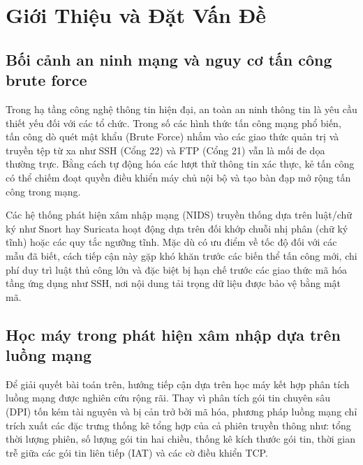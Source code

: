 
\chapter{Giới Thiệu và Đặt Vấn Đề}
\label{chap:gioi_thieu}

\section{Bối cảnh an ninh mạng và nguy cơ tấn công brute force}

Trong hạ tầng công nghệ thông tin hiện đại, an toàn an ninh thông tin là yêu cầu thiết yếu đối với các tổ chức. Trong số các hình thức tấn công mạng phổ biến, tấn công dò quét mật khẩu (Brute Force) nhắm vào các giao thức quản trị và truyền tệp từ xa như SSH (Cổng 22) và FTP (Cổng 21) vẫn là mối đe dọa thường trực. Bằng cách tự động hóa các lượt thử thông tin xác thực, kẻ tấn công có thể chiếm đoạt quyền điều khiển máy chủ nội bộ và tạo bàn đạp mở rộng tấn công trong mạng.

Các hệ thống phát hiện xâm nhập mạng (NIDS) truyền thống dựa trên luật/chữ ký như Snort \cite{roesch1999snort} hay Suricata \cite{suricata_oisf} hoạt động dựa trên đối khớp chuỗi nhị phân (chữ ký tĩnh) hoặc các quy tắc ngưỡng tĩnh. Mặc dù có ưu điểm về tốc độ đối với các mẫu đã biết, cách tiếp cận này gặp khó khăn trước các biến thể tấn công mới, chi phí duy trì luật thủ công lớn và đặc biệt bị hạn chế trước các giao thức mã hóa tầng ứng dụng như SSH, nơi nội dung tải trọng dữ liệu được bảo vệ bằng mật mã.

\section{Học máy trong phát hiện xâm nhập dựa trên luồng mạng}

Để giải quyết bài toán trên, hướng tiếp cận dựa trên học máy kết hợp phân tích luồng mạng được nghiên cứu rộng rãi. Thay vì phân tích gói tin chuyên sâu (DPI) tốn kém tài nguyên và bị cản trở bởi mã hóa, phương pháp luồng mạng chỉ trích xuất các đặc trưng thống kê tổng hợp của cả phiên truyền thông như: tổng thời lượng phiên, số lượng gói tin hai chiều, thống kê kích thước gói tin, thời gian trễ giữa các gói tin liên tiếp (IAT) và các cờ điều khiển TCP.

